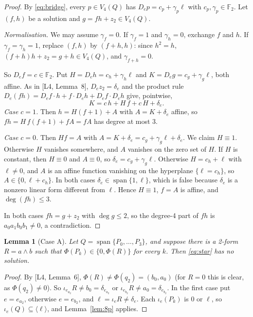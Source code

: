 \documentclass[11pt,a4paper]{article}
\theoremstyle{plain}
\newtheorem{lemma}[theorem]{Lemma}
\theoremstyle{definition}
\theoremstyle{remark}
\newcommand{\F}{\mathbb{F}_2}
\newcommand{\Span}{\operatorname{span}}
\begin{document}
\begin{proof}
By \eqref{eq:bridge}, every $p\in V_4(Q)$ has $D_ep=c_p+\gamma_p\ell$ with $c_p,\gamma_p\in\F$. Let $(f,h)$ be a solution and $g=fh+z_2\in V_4(Q)$.

\emph{Normalisation.} We may assume $\gamma_f=0$. If $\gamma_f=1$ and $\gamma_h=0$, exchange $f$ and $h$. If $\gamma_f=\gamma_h=1$, replace $(f,h)$ by $(f+h,h)$: since $h^2=h$, $(f+h)h+z_2=g+h\in V_4(Q)$, and $\gamma_{f+h}=0$.

So $D_ef=c\in\F$. Put $H=D_eh=c_h+\gamma_h\ell$ and $K=D_eg=c_g+\gamma_g\ell$, both affine. As in [L4, Lemma~8], $D_ez_2=\delta_e$ and the product rule $D_e(fh)=D_ef\cdot h+f\cdot D_eh+D_ef\cdot D_eh$ give, pointwise,
\[
  K=c\,h+H\,f+c\,H+\delta_e .
\]
\emph{Case $c=1$.} Then $h=H(f+1)+A$ with $A=K+\delta_e$ affine, so $fh=H\,f(f+1)+fA=fA$ has degree at most $3$.

\emph{Case $c=0$.} Then $Hf=A$ with $A=K+\delta_e=c_g+\gamma_g\ell+\delta_e$. We claim $H\equiv1$. Otherwise $H$ vanishes somewhere, and $A$ vanishes on the zero set of $H$. If $H$ is constant, then $H\equiv0$ and $A\equiv0$, so $\delta_e=c_g+\gamma_g\ell$. Otherwise $H=c_h+\ell$ with $\ell\ne0$, and $A$ is an affine function vanishing on the hyperplane $\{\ell=c_h\}$, so $A\in\{0,\ell+c_h\}$. In both cases $\delta_e\in\Span\{1,\ell\}$, which is false because $\delta_e$ is a nonzero linear form different from $\ell$. Hence $H\equiv1$, $f=A$ is affine, and $\deg(fh)\le3$.

In both cases $fh=g+z_2$ with $\deg g\le2$, so the degree-4 part of $fh$ is $a_0a_1b_0b_1\ne0$, a contradiction.
\end{proof}

\begin{lemma}[Case A]\label{lem:A}
Let $Q=\Span\{P_0,\dots,P_3\}$, and suppose there is a 2-form $R=a\wedge b$ such that $\Phi(P_k)\in\{0,\Phi(R)\}$ for every $k$. Then \eqref{eq:star} has no solution.
\end{lemma}

\begin{proof}
By [L4, Lemma~6], $\Phi(R)\ne\Phi(q_2)=(b_0,a_0)$ (for $R=0$ this is clear, as $\Phi(q_2)\ne0$). So $\iota_{e_{a_2}}R\ne b_0=\delta_{e_{a_2}}$ or $\iota_{e_{b_2}}R\ne a_0=\delta_{e_{b_2}}$. In the first case put $e=e_{a_2}$, otherwise $e=e_{b_2}$, and $\ell=\iota_eR\ne\delta_e$. Each $\iota_e(P_k)$ is $0$ or $\ell$, so $\iota_e(Q)\subseteq\langle\ell\rangle$, and Lemma~\ref{lem:8p} applies.
\end{proof}
\end{document}
